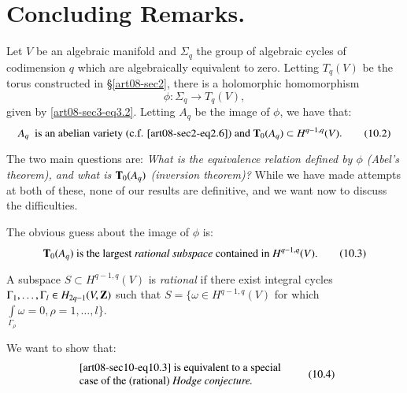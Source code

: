 \section{Concluding Remarks.}\label{art08-sec10}

Let $V$ be an algebraic manifold and $\Sigma_{q}$ the group of algebraic cycles of codimension $q$ which are algebraically equivalent to zero. Letting $T_{q}(V)$ be the torus constructed in \S\ref{art08-sec2}, there is a holomorphic homomorphism
\begin{equation*}
\phi : \Sigma_{q}\to T_{q}(V),\tag{10.1}\label{art08-sec10-eq10.1}
\end{equation*}
given by \eqref{art08-sec3-eq3.2}. Letting $A_{q}$ be the image of $\phi$, we have that:
\begin{equation*}
A_{q}\text{~ is an abelian variety (c.f. \eqref{art08-sec2-eq2.6}) and } \mathbf{T}_{0}(A_{q})\subset H^{q-1,q}(V).\tag{10.2}\label{art08-sec10-eq10.2}
\end{equation*}

The two main questions are: {\em What is the equivalence relation defined by $\phi$ (Abel's theorem), and what is $\mathbf{T}_{0}(A_{q})$ (inversion theorem)?} While we have made attempts at both of these, none of our results are definitive, and we want now to discuss the difficulties.

The obvious guess about the image of $\phi$ is:
\begin{equation*}
\mathbf{T}_{0}(A_{q})\text{ is the largest {\em rational subspace} contained in } H^{q-1,q}(V).\tag{10.3}\label{art08-sec10-eq10.3}
\end{equation*}

\begin{remark*}
A subspace $S\subset H^{q-1,q}(V)$ is {\em rational} if there exist integral cycles $\Gamma_{1},\ldots,\Gamma_{l}\in H_{2q-1}(V,\mathbf{Z})$ such that $S=\{\omega\in H^{q-1,q}(V)$ for which $\int\limits_{\Gamma_{\rho}}\omega=0,\rho=1,\ldots,l\}$.
\end{remark*}

We want to show that:
\begin{equation*}
\begin{array}{l}
\text{\eqref{art08-sec10-eq10.3} is equivalent to a special}\\
\text{case of the (rational) {\em Hodge conjecture.}}
\end{array}\tag{10.4}\label{art08-sec10-eq10.4}
\end{equation*}

